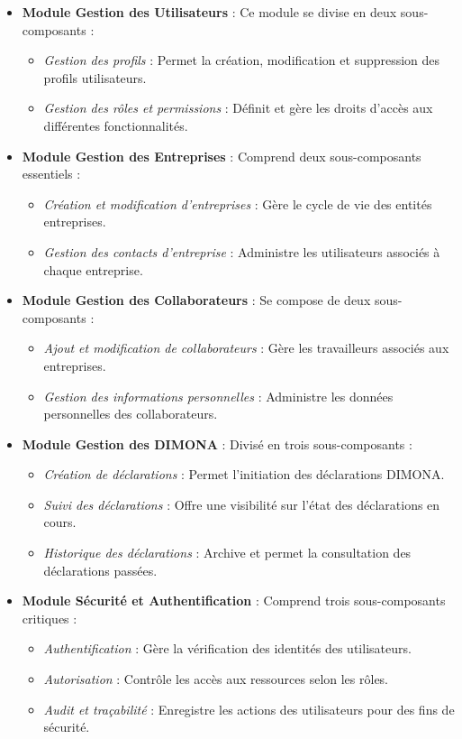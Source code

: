 \begin{itemize}
  \item \textbf{Module Gestion des Utilisateurs} : Ce module se divise en deux sous-composants :
    \begin{itemize}
      \item \textit{Gestion des profils} : Permet la création, modification et suppression des profils utilisateurs.
      \item \textit{Gestion des rôles et permissions} : Définit et gère les droits d'accès aux différentes fonctionnalités.
    \end{itemize}
  
  \item \textbf{Module Gestion des Entreprises} : Comprend deux sous-composants essentiels :
    \begin{itemize}
      \item \textit{Création et modification d'entreprises} : Gère le cycle de vie des entités entreprises.
      \item \textit{Gestion des contacts d'entreprise} : Administre les utilisateurs associés à chaque entreprise.
    \end{itemize}
  
  \item \textbf{Module Gestion des Collaborateurs} : Se compose de deux sous-composants :
    \begin{itemize}
      \item \textit{Ajout et modification de collaborateurs} : Gère les travailleurs associés aux entreprises.
      \item \textit{Gestion des informations personnelles} : Administre les données personnelles des collaborateurs.
    \end{itemize}
  
  \item \textbf{Module Gestion des DIMONA} : Divisé en trois sous-composants :
    \begin{itemize}
      \item \textit{Création de déclarations} : Permet l'initiation des déclarations DIMONA.
      \item \textit{Suivi des déclarations} : Offre une visibilité sur l'état des déclarations en cours.
      \item \textit{Historique des déclarations} : Archive et permet la consultation des déclarations passées.
    \end{itemize}
  
  \item \textbf{Module Sécurité et Authentification} : Comprend trois sous-composants critiques :
    \begin{itemize}
      \item \textit{Authentification} : Gère la vérification des identités des utilisateurs.
      \item \textit{Autorisation} : Contrôle les accès aux ressources selon les rôles.
      \item \textit{Audit et traçabilité} : Enregistre les actions des utilisateurs pour des fins de sécurité.
    \end{itemize}
\end{itemize}

